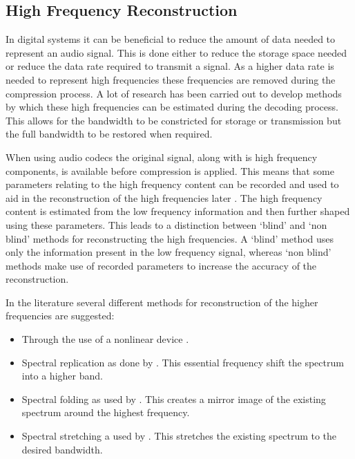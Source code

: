 	\subsection{High Frequency Reconstruction}
	\label{sec:Excitation-Uses-Reconstruction}
		In digital systems it can be beneficial to reduce the amount of data needed to represent an audio signal.
		This is done either to reduce the storage space needed or reduce the data rate required to transmit a
		signal. As a higher data rate is needed to represent high frequencies these frequencies are removed during
		the compression process. A lot of research has been carried out to develop methods by which these high
		frequencies can be estimated during the decoding process. This allows for the bandwidth to be constricted
		for storage or transmission but the full bandwidth to be restored when required.

		When using audio codecs the original signal, along with is high frequency components, is available before
		compression is applied. This means that some parameters relating to the high frequency content can be
		recorded and used to aid in the reconstruction of the high frequencies later \citep{dietz2002spectral,
		friedrich2007spectral}. The high frequency content is estimated from the low frequency information and
		then further shaped using these parameters. This leads to a distinction between `blind' and `non blind'
		methods for reconstructing the high frequencies. A `blind' method uses only the information present in the
		low frequency signal, whereas `non blind' methods make use of recorded parameters to increase the accuracy
		of the reconstruction.

		In the literature several different methods for reconstruction of the higher frequencies are suggested:

		\begin{itemize}
			\item Through the use of a nonlinear device \citep{larsen2002efficient, sha2010high}.
			\item Spectral replication as done by \citet{nagel2010a}. This essential frequency shift the
			      spectrum into a higher band.
			\item Spectral folding as used by \citet{friedrich2007spectral}. This creates a mirror image of the
			      existing spectrum around the highest frequency.
			\item Spectral stretching a used by \citet{nagel2009a}. This stretches the existing spectrum to the
		              desired bandwidth.
		\end{itemize}

